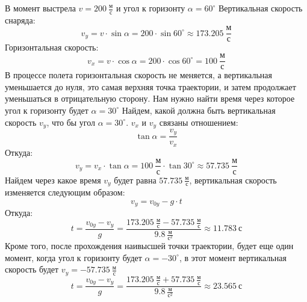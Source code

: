 \documentclass{minimal}
\begin{document}
    В момент выстрела $v=200~\frac{\text{м}}{\text{с}}$ и угол к горизонту $\alpha=60^{\circ}$ Вертикальная скорость снаряда:
    \[
        v_y=v \cdot \sin{\alpha}=200 \cdot \sin{60^{\circ}}\approx173.205~\frac{\text{м}}{\text{с}}
    \]
    Горизонтальная скорость:
    \[
        v_x=v \cdot \cos{\alpha}=200 \cdot \cos{60^{\circ}}=100~\frac{\text{м}}{\text{с}} 
    \]
    В процессе полета горизонтальная скорость не меняется, а вертикальная уменьшается до нуля, это самая верхняя точка траектории, и затем продолжает уменьшаться в отрицательную сторону.
    Нам нужно найти время через которое угол к горизонту будет $\alpha=30^{\circ}$ Найдем, какой должна быть вертикальная скорость $v_y$, что бы угол $\alpha=30^{\circ}$. $v_x$ и $v_y$ связаны отношением:
    \[
        \tan{\alpha}=\frac{v_y}{v_x}
    \]
    Откуда:
    \[
        v_y=v_x \cdot \tan{\alpha}=100~\frac{\text{м}}{\text{с}} \cdot \tan{30^{\circ}} \approx 57.735~\frac{\text{м}}{\text{с}}
    \]
    Найдем через какое время $v_y$ будет равна $57.735~\frac{\text{м}}{\text{с}}$, вертикальная скорость изменяется следующим образом:
    \[
        v_y=v_{0y} - g \cdot t
    \]
    Откуда:
    \[
        t = \frac{v_{0y} - v_y}{g}=\frac{173.205~\frac{\text{м}}{\text{с}} - 57.735~\frac{\text{м}}{\text{с}}}{9.8~\frac{\text{м}}{\text{с}^2}} \approx 11.783~\text{с}
    \]
    Кроме того, после прохождения наивысшей точки траектории, будет еще один момент, когда угол к горизонту будет $\alpha=-30^{\circ}$, в этот момент вертикальная скорость будет $v_y=-57.735~\frac{\text{м}}{\text{с}}$
    \[
        t = \frac{v_{0y} - v_y}{g}=\frac{173.205~\frac{\text{м}}{\text{с}} + 57.735~\frac{\text{м}}{\text{с}}}{9.8~\frac{\text{м}}{\text{с}^2}} \approx 23.565~\text{с}
    \]
\end{document}
